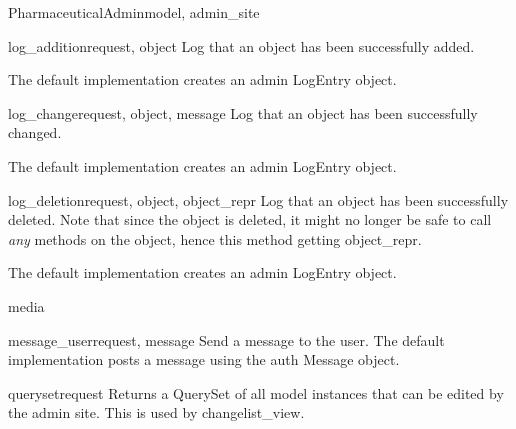 \documentclass[letterpaper,10pt,english]{sphinxmanual}
\begin{document}
\begin{classdesc}{PharmaceuticalAdmin}{model, admin\_site}
\hypertarget{data.admin.PharmaceuticalAdmin.log_addition}{}\begin{methoddesc}{log\_addition}{request, object}
Log that an object has been successfully added.

The default implementation creates an admin LogEntry object.
\end{methoddesc}

\hypertarget{data.admin.PharmaceuticalAdmin.log_change}{}\begin{methoddesc}{log\_change}{request, object, message}
Log that an object has been successfully changed.

The default implementation creates an admin LogEntry object.
\end{methoddesc}

\hypertarget{data.admin.PharmaceuticalAdmin.log_deletion}{}\begin{methoddesc}{log\_deletion}{request, object, object\_repr}
Log that an object has been successfully deleted. Note that since the
object is deleted, it might no longer be safe to call \emph{any} methods
on the object, hence this method getting object\_repr.

The default implementation creates an admin LogEntry object.
\end{methoddesc}

\hypertarget{data.admin.PharmaceuticalAdmin.media}{}\begin{memberdesc}{media}\end{memberdesc}

\hypertarget{data.admin.PharmaceuticalAdmin.message_user}{}\begin{methoddesc}{message\_user}{request, message}
Send a message to the user. The default implementation
posts a message using the auth Message object.
\end{methoddesc}

\hypertarget{data.admin.PharmaceuticalAdmin.queryset}{}\begin{methoddesc}{queryset}{request}
Returns a QuerySet of all model instances that can be edited by the
admin site. This is used by changelist\_view.
\end{methoddesc}


\end{classdesc}
\end{document}
